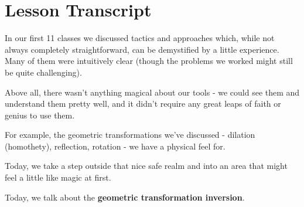 \section{Lesson Transcript}










In our first 11 classes we discussed tactics and approaches which, while not always completely straightforward, can be demystified by a little experience.  Many of them were intuitively clear (though the problems we worked might still be quite challenging).

Above all, there wasn't anything magical about our tools - we could see them and understand them pretty well, and it didn't require any great leaps of faith or genius to use them.

For example, the geometric transformations we've discussed - dilation (homothety), reflection, rotation - we have a physical feel for.

Today, we take a step outside that nice safe realm and into an area that might feel a little like magic at first.

Today, we talk about the \textbf{geometric transformation inversion}.

